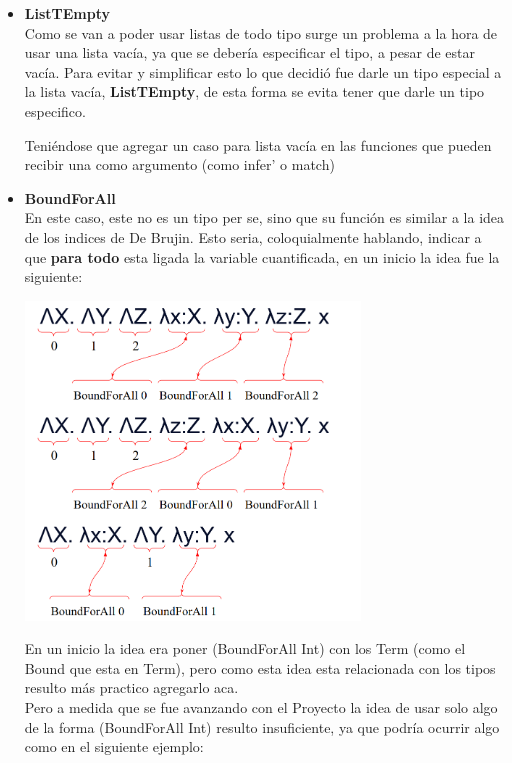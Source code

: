 \documentclass[12pt, titlepage, a4paper]{article}
\begin{document}
\begin{itemize}[label=$\bullet$]
  \item {\textbf{ListTEmpty}\\
  Como se van a poder usar listas de todo tipo surge un problema a la hora de usar una lista vacía, ya que se debería especificar el tipo, 
  a pesar de estar vacía. 
  Para evitar y simplificar esto lo que decidió fue darle un tipo especial a la lista vacía, \textbf{ListTEmpty}, de esta forma se evita 
  tener que darle un tipo especifico.
  
  Teniéndose que agregar un caso para lista vacía en las funciones que pueden recibir una como argumento (como infer' o match)
  }

  \item {\textbf{BoundForAll}\\
  En este caso, este no es un tipo per se, sino que su función es similar a la idea 
  de los indices de De Brujin. Esto seria, coloquialmente hablando, indicar a que \textbf{para todo} esta ligada la variable cuantificada, 
  en un inicio la idea fue la siguiente:

  \begin{center}
      \includegraphics[width=0.7\textwidth]{Imagenes/EjemploBoundForAll.png}
  \end{center}

  En un inicio la idea era poner (BoundForAll Int) con los Term (como el Bound que esta en Term), pero como esta idea esta relacionada con 
  los tipos resulto más practico agregarlo aca.\\
  
  Pero a medida que se fue avanzando con el Proyecto la idea de usar solo algo de la forma (BoundForAll Int) resulto insuficiente, ya que podría ocurrir algo 
  como en el siguiente ejemplo:
  
}
\end{itemize}
\end{document}
